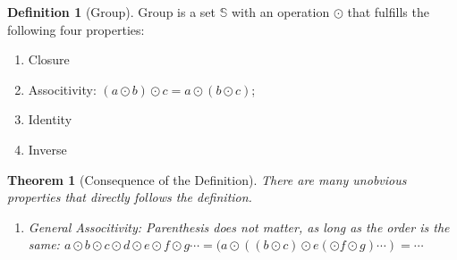 \documentclass[12pt, a4paper]{report}
\newtheorem{theorem}{Theorem}[section]
\theoremstyle{definition}
\newtheorem{definition}{Definition}[section]
\theoremstyle{definition}
\theoremstyle{remark}
\begin{document}
\begin{definition}[Group]
Group is a set $\mathbb{S}$ with an operation $\odot$ that fulfills the following four properties:
\begin{enumerate}
	\item Closure
	\item Associtivity: $(a \odot b) \odot c = a \odot (b \odot c)$;
	\item Identity
	\item Inverse
\end{enumerate}
\end{definition}
\begin{theorem}[Consequence of the Definition]
There are many unobvious properties that directly follows the definition.
\begin{enumerate}
	\item General Associtivity: Parenthesis does not matter, as long as the order is the same: 
		$a \odot b \odot c \odot d \odot e \odot f \odot g \cdots  = (a \odot ((b \odot c) \odot e (\odot f \odot g)\cdots) = \cdots$
\end{enumerate}
\end{theorem}
\end{document}
